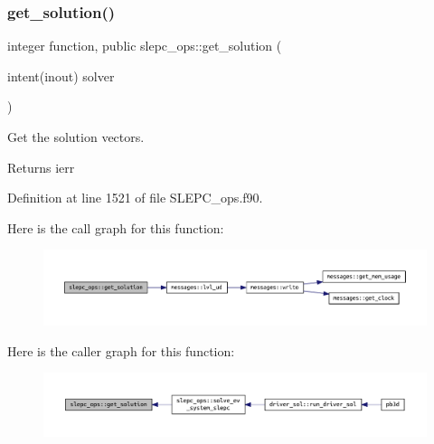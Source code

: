 \subsubsection{\texorpdfstring{get\+\_\+solution()}{get\_solution()}}
{\footnotesize\ttfamily integer function, public slepc\+\_\+ops\+::get\+\_\+solution (\begin{DoxyParamCaption}\item[{intent(inout)}]{solver }\end{DoxyParamCaption})}



Get the solution vectors. 

\begin{DoxyReturn}{Returns}
ierr 
\end{DoxyReturn}


Definition at line 1521 of file S\+L\+E\+P\+C\+\_\+ops.\+f90.

Here is the call graph for this function\+:\nopagebreak
\begin{figure}[H]
\begin{center}
\leavevmode
\includegraphics[width=350pt]{namespaceslepc__ops_aabe2aef90f039316bf3f03e651a6e7e0_cgraph}
\end{center}
\end{figure}
Here is the caller graph for this function\+:\nopagebreak
\begin{figure}[H]
\begin{center}
\leavevmode
\includegraphics[width=350pt]{namespaceslepc__ops_aabe2aef90f039316bf3f03e651a6e7e0_icgraph}
\end{center}
\end{figure}
\mbox{\label{namespaceslepc__ops_a05f8a23335ed47ad1996cddf3bcfdc2e}} 
